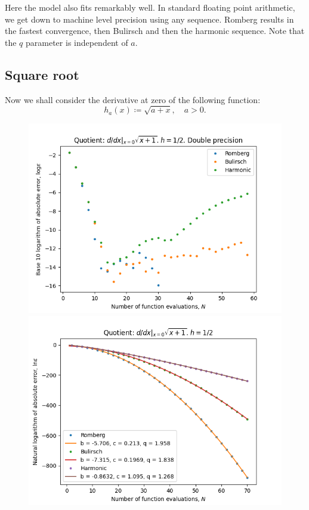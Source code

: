 Here the model also fits remarkably well. In standard floating point arithmetic, we get down to machine level precision using any sequence.  Romberg results in the fastest convergence, then Bulirsch and then the harmonic sequence. Note that the \(q\) parameter is independent of \(a\).

\subsection{Square root}

Now we shall consider the derivative at zero of the following function:
\[
h_a(x) \coloneqq \sqrt{a + x}, \quad a > 0.
\]

\begin{figure}[H]
\centering
\begin{minipage}{0.45\textwidth}
\centering
\includegraphics[scale=0.45]{diff_quot_plots/sqrt_1.png}
\end{minipage}
\begin{minipage}{0.45\textwidth}
\centering
\includegraphics[scale=0.45]{diff_quot_plots/sqrt_1_hp_trend.png}
\end{minipage}
\end{figure}

